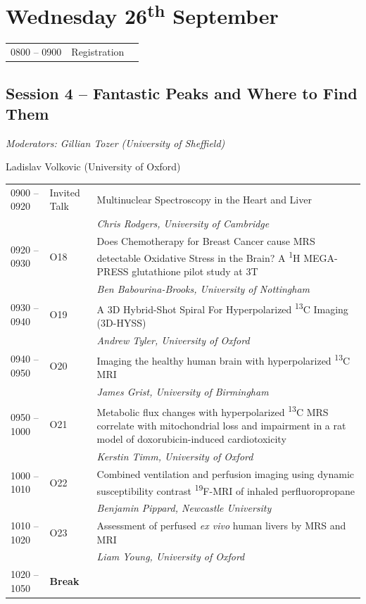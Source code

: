 \documentclass[a5paper,10pt,twoside,onecolumn,openany,helvetica,showtrims]{memoir}
\newlength{\JackBoxOne}
\newlength{\JackBoxTwo}
\newlength{\JackBoxThree}
\newcommand{\talkauthor}[1]{\small\emph{#1}}
\begin{document}
\section{Wednesday 26\textsuperscript{th} September}
\noindent\hspace{-0.75em}\begin{tabular}{p{\JackBoxOne}p{\JackBoxTwo}p{\JackBoxThree}}
0800 -- 0900 & Registration &\\
\end{tabular}
\subsection*{Session 4 -- Fantastic Peaks and Where to Find Them}
\begin{flushright}
\itshape Moderators: Gillian Tozer (University of Sheffield) 

Ladislav Volkovic (University of Oxford)
\end{flushright}
\noindent\hspace{-0.75em}\begin{longtable}{p{\JackBoxOne}p{\JackBoxTwo}p{\JackBoxThree}}
0900 -- 0920 & Invited Talk & Multinuclear Spectroscopy in the Heart and Liver \\ 
& & \talkauthor{Chris Rodgers, University of Cambridge}\\
0920 -- 0930 & O18 & Does Chemotherapy for Breast Cancer cause MRS detectable Oxidative Stress in the Brain? A \textsuperscript{1}H MEGA-PRESS glutathione pilot study at 3T \\
& & \talkauthor{Ben Babourina-Brooks, University of Nottingham}\\
0930 -- 0940 & O19 & A 3D Hybrid-Shot Spiral For Hyperpolarized \textsuperscript{13}C Imaging (3D-HYSS) \\
& & \talkauthor{Andrew Tyler, University of Oxford} \\ 
0940 -- 0950 & O20 & Imaging the healthy human brain with hyperpolarized \textsuperscript{13}C MRI \\ 
& & \talkauthor{James Grist, University of Birmingham}\\
0950 -- 1000 & O21 & Metabolic flux changes with hyperpolarized \textsuperscript{13}C MRS correlate with mitochondrial loss and impairment in a rat model of doxorubicin-induced cardiotoxicity \\ 
& &  \talkauthor{Kerstin Timm, University of Oxford} \\ 
1000 -- 1010 & O22 &  Combined ventilation and perfusion imaging using dynamic susceptibility contrast \textsuperscript{19}F-MRI of inhaled perfluoropropane \\ 
& & \talkauthor{Benjamin Pippard, Newcastle University} \\ 
1010 -- 1020 & O23 &  Assessment of perfused \emph{ex vivo} human livers by MRS and MRI \\ 
& & \talkauthor{Liam Young, University of Oxford} \\ 
1020 -- 1050 & \textbf{Break} & 
\end{longtable}
\clearpage
\end{document}
